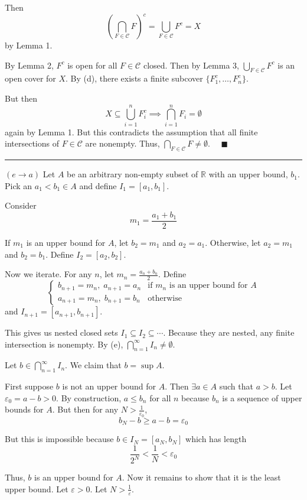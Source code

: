 \documentclass[12pt]{article}
\newcommand{\R}{\mathbb{R}}
\newcommand{\qed}{\quad \blacksquare}
\newcommand{\ep}{\varepsilon}
\newcommand{\sub}{\subseteq}
\renewcommand{\div}{\vspace*{10pt}\hrule\vspace*{10pt}}
\begin{document}
    Then 
    \[\left(\bigcap_{F \in \mathcal C} F\right)^c = \bigcup_{F \in \mathcal C} F^c = X\]
    by Lemma 1. 
    
    By Lemma 2, $F^c$ is open for all $F \in \mathcal C$ closed. Then by Lemma 3, $\bigcup_{F \in \mathcal C} F^c$ is an open cover for $X$. By (d), there exists a finite subcover $\{F_1^c, \dots, F_n^c\}$. 
    
    But then
    \[X \sub \bigcup_{i=1}^n F_i^c  \implies \bigcap_{i=1}^n F_i = \emptyset\]
    again by Lemma 1. But this contradicts the assumption that all finite intersections of $F \in \mathcal C$ are nonempty. Thus, $\bigcap_{F \in \mathcal C} F \neq \emptyset$. $\qed$

    \div 

    $(e \to a)$ Let $A$ be an arbitrary non-empty subset of $\R$ with an upper bound, $b_1$. Pick an $a_1 < b_1 \in A$ and define $I_1 = [a_1, b_1]$. 

    Consider
    \[m_1 = \frac{a_1 + b_1}{2}\] 

    If $m_1$ is an upper bound for $A$, let $b_2 = m_1$ and $a_2 = a_1$. Otherwise, let $a_2 = m_1$ and $b_2 = b_1$. Define $I_2 = [a_2, b_2]$.

    Now we iterate. For any $n$, let $m_n = \frac{a_n + b_n}{2}$. Define 
    \[\begin{cases}
        b_{n+1} = m_n, \; a_{n+1} = a_n & \text{if } m_n \text{ is an upper bound for } A\\
        a_{n+1} = m_n, \; b_{n+1} = b_n & \text{otherwise}
    \end{cases}\] 
    and $I_{n+1} = [a_{n+1}, b_{n+1}]$.

    This gives us nested closed sets $I_1 \subseteq I_2 \subseteq \cdots$. Because they are nested, any finite intersection is nonempty. By (e), $\bigcap_{n=1}^\infty I_n \neq \emptyset$.

    Let $b \in \bigcap_{n=1}^{\infty} I_n$. We claim that $b = \sup A$. 

    First suppose $b$ is not an upper bound for $A$. Then $\exists a \in A$ such that $a > b$. Let $\ep_0 = a -b > 0$. By construction, $a \leq b_n$ for all $n$ because $b_n$ is a sequence of upper bounds for $A$. But then for any $N > \frac{1}{\ep_0}$, 
    \[b_N - b \geq a - b = \ep_0\]

    But this is impossible because $b \in I_N = [a_N, b_N]$ which has length 
    \[\frac{1}{2^N} < \frac{1}{N} < \ep_0\]

    Thus, $b$ is an upper bound for $A$. Now it remains to show that it is the least upper bound. Let $\ep > 0$. Let $N > \frac{1}{\ep}$.
\end{document}

